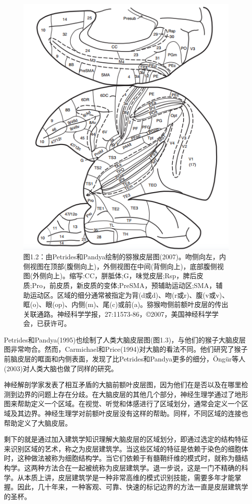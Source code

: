 \begin{figure}[!htb]
	\centering
	\includegraphics[width=0.5\linewidth]{image_pfc/Fig_1_2}
	\caption{图1.2：由Petrides和Pandya绘制的猕猴皮层图(2007)。吻侧向左，内侧视图在顶部(腹侧向上)，外侧视图在中间(背侧向上)，底部腹侧视图(外侧向上)。缩写:CC，胼胝体;G，味觉皮层;Rsp，脾后皮质;Pro，前皮质，新皮质的变体;PreSMA，预辅助运动区;SMA，辅助运动区。区域的细分通常被指定为背(d或d)、吻(r或r)、腹(v或v)、眶(o)、眼(op)、内侧(m)、尾(c)或前(a)。猕猴吻侧前额叶皮层的传出关联通路。神经科学学报，27:11573-86，©2007，美国神经科学学会，已获许可。\label{fig:fig_1_2}}
\end{figure}


\par
Petrides和Pandya(1995)也绘制了人类大脑皮层图(图1.3)，与他们的猴子大脑皮层图非常吻合。然而，Carmichael和Price(1994)对大脑的看法不同。他们研究了猴子前脑皮层的眶面和内侧表面，发现了比Petrides和Pandya更多的细分，Öngür等人(2003)对人类大脑也做了同样的研究。

\par
神经解剖学家发表了相互矛盾的大脑前额叶皮层图，因为他们在是否以及在哪里检测到边界的问题上存在分歧。在大脑皮层的其他几个部分，神经生理学通过了地形图来帮助定义一个区域。在视觉、听觉和体感进行了区域划分，通常会定义一个区域及其边界。神经生理学对前额叶皮层没有这样的帮助。同样，不同区域的连接也帮助定义了大脑皮层。
\par
剩下的就是通过加入建筑学知识理解大脑皮层的区域划分，即通过选定的结构特征来识别区域的艺术，称之为皮层建筑学。当这些区域的特征是依赖于染色的细胞体时，这种做法被称为细胞结构学。当它们依赖于有髓鞘纤维的模式时，就称为髓结构学。这两种方法合在一起被统称为皮层建筑学。退一步说，这是一门不精确的科学。从本质上讲，皮层建筑学是一种非常高维的模式识别技能，需要多年才能掌握。因此，几十年来，一种客观、可靠、快速的标记边界的方法一直是皮层建筑学的圣杯。

